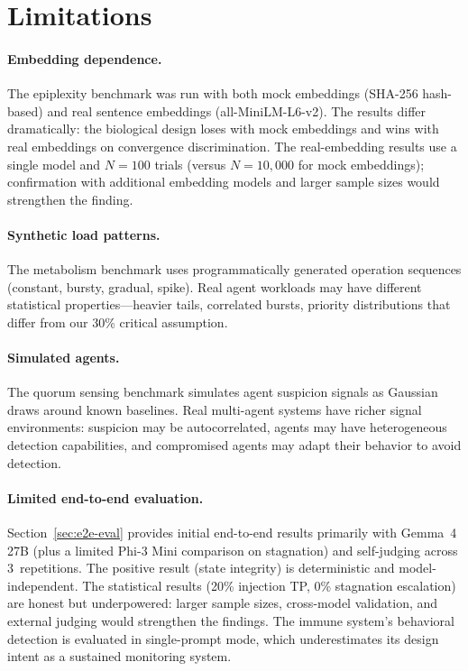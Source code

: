 \section{Limitations}\label{sec:limitations}

\paragraph{Embedding dependence.}
The epiplexity benchmark was run with both mock embeddings (SHA-256
hash-based) and real sentence embeddings (all-MiniLM-L6-v2).  The
results differ dramatically: the biological design loses with mock
embeddings and wins with real embeddings on convergence discrimination.
The real-embedding results use a single model and $N = 100$ trials
(versus $N = 10{,}000$ for mock embeddings); confirmation with
additional embedding models and larger sample sizes would strengthen
the finding.

\paragraph{Synthetic load patterns.}
The metabolism benchmark uses programmatically generated operation
sequences (constant, bursty, gradual, spike).  Real agent workloads
may have different statistical properties---heavier tails, correlated
bursts, priority distributions that differ from our 30\% critical
assumption.

\paragraph{Simulated agents.}
The quorum sensing benchmark simulates agent suspicion signals as
Gaussian draws around known baselines.  Real multi-agent systems have
richer signal environments: suspicion may be autocorrelated, agents
may have heterogeneous detection capabilities, and compromised agents
may adapt their behavior to avoid detection.

\paragraph{Limited end-to-end evaluation.}
Section~\ref{sec:e2e-eval} provides initial end-to-end results
primarily with Gemma~4 27B (plus a limited Phi-3 Mini comparison on
stagnation) and self-judging across 3~repetitions.
The positive result (state integrity) is deterministic and
model-independent.  The statistical results (20\% injection TP, 0\%
stagnation escalation) are honest but underpowered: larger sample
sizes, cross-model validation, and external judging would strengthen
the findings.  The immune system's behavioral detection is evaluated
in single-prompt mode, which underestimates its design intent as a
sustained monitoring system.

